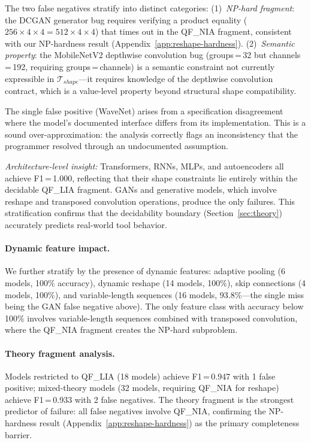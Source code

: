 \documentclass[11pt]{article}
\begin{document}
The two false negatives stratify into distinct categories:
(1)~\emph{NP-hard fragment}: the DCGAN generator bug requires
verifying a product equality ($256 \times 4 \times 4 = 512 \times 4
\times 4$) that times out in the QF\_NIA fragment, consistent with
our NP-hardness result (Appendix~\ref{app:reshape-hardness}).
(2)~\emph{Semantic property}: the MobileNetV2 depthwise convolution
bug (groups\,=\,32 but channels\,=\,192, requiring groups\,=\,channels)
is a semantic constraint not currently expressible in
$\mathcal{T}_{\mathit{shape}}$---it requires knowledge of the
depthwise convolution contract, which is a value-level property
beyond structural shape compatibility.

The single false positive (WaveNet) arises from a specification
disagreement where the model's documented interface differs from
its implementation.  This is a sound over-approximation: the
analysis correctly flags an inconsistency that the programmer
resolved through an undocumented assumption.

\emph{Architecture-level insight:} Transformers, RNNs, MLPs, and
autoencoders all achieve F1\,=\,1.000, reflecting that their shape
constraints lie entirely within the decidable QF\_LIA fragment.
GANs and generative models, which involve reshape and transposed
convolution operations, produce the only failures.
This stratification confirms that the decidability boundary
(Section~\ref{sec:theory}) accurately predicts real-world tool behavior.

\paragraph{Dynamic feature impact.}
We further stratify by the presence of dynamic features:
adaptive pooling (6 models, 100\% accuracy),
dynamic reshape (14 models, 100\%),
skip connections (4 models, 100\%),
and variable-length sequences (16 models, 93.8\%---the single
miss being the GAN false negative above).
The only feature class with accuracy below 100\% involves
variable-length sequences combined with transposed convolution,
where the QF\_NIA fragment creates the NP-hard subproblem.

\paragraph{Theory fragment analysis.}
Models restricted to QF\_LIA (18 models) achieve F1\,=\,0.947
with 1 false positive; mixed-theory models (32 models, requiring
QF\_NIA for reshape) achieve F1\,=\,0.933 with 2 false negatives.
The theory fragment is the strongest predictor of failure:
all false negatives involve QF\_NIA, confirming the NP-hardness
result (Appendix~\ref{app:reshape-hardness}) as the primary
completeness barrier.
\end{document}
